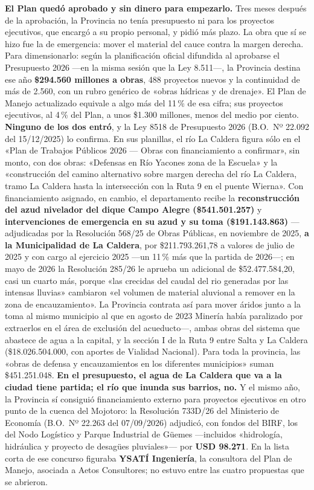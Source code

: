 \begin{cautela}
\textbf{El Plan quedó aprobado y sin dinero para empezarlo.} Tres meses después de la aprobación, la Provincia no tenía presupuesto ni para los proyectos ejecutivos, que encargó a su propio personal, y pidió más plazo. La obra que sí se hizo fue la de emergencia: mover el material del cauce contra la margen derecha. Para dimensionarlo: según la planificación oficial difundida al aprobarse el Presupuesto 2026 ---en la misma sesión que la Ley 8.511---, la Provincia destina ese año \textbf{\$294.560 millones a obras}, 488 proyectos nuevos y la continuidad de más de 2.560, con un rubro genérico de «obras hídricas y de drenaje». El Plan de Manejo actualizado equivale a algo más del 11\,\% de esa cifra; sus proyectos ejecutivos, al 4\,\% del Plan, a unos \$1.300 millones, menos del medio por ciento. \textbf{Ninguno de los dos entró}, y la Ley 8518 de Presupuesto 2026 (B.O.\ Nº 22.092 del 15/12/2025) lo confirma. En sus planillas, el río La Caldera figura sólo en el «Plan de Trabajos Públicos 2026 --- Obras con financiamiento a confirmar», sin monto, con dos obras: «Defensas en Río Yacones zona de la Escuela» y la «construcción del camino alternativo sobre margen derecha del río La Caldera, tramo La Caldera hasta la intersección con la Ruta 9 en el puente Wierna». Con financiamiento asignado, en cambio, el departamento recibe la \textbf{reconstrucción del azud nivelador del dique Campo Alegre (\$541.501.257)} y \textbf{intervenciones de emergencia en su azud y su toma (\$191.143.863)} ---adjudicadas por la Resolución 568/25 de Obras Públicas, en noviembre de 2025, \textbf{a la Municipalidad de La Caldera}, por \$211.793.261,78 a valores de julio de 2025 y con cargo al ejercicio 2025 ---un 11\,\% más que la partida de 2026---; en mayo de 2026 la Resolución 285/26 le aprueba un adicional de \$52.477.584,20, casi un cuarto más, porque «las crecidas del caudal del rio generadas por las intensas lluvias» cambiaron «el volumen de material aluvional a remover en la zona de encauzamiento». La Provincia contrata así para mover áridos junto a la toma al mismo municipio al que en agosto de 2023 Minería había paralizado por extraerlos en el área de exclusión del acueducto---, ambas obras del sistema que abastece de agua a la capital, y la sección I de la Ruta 9 entre Salta y La Caldera (\$18.026.504.000, con aportes de Vialidad Nacional). Para toda la provincia, las «obras de defensa y encauzamientos en los diferentes municipios» suman \$451.251.048. \textbf{En el presupuesto, el agua de La Caldera que va a la ciudad tiene partida; el río que inunda sus barrios, no.} Y el mismo año, la Provincia sí consiguió financiamiento externo para proyectos ejecutivos en otro punto de la cuenca del Mojotoro: la Resolución 733D/26 del Ministerio de Economía (B.O.\ Nº 22.263 del 07/09/2026) adjudicó, con fondos del BIRF, los del Nodo Logístico y Parque Industrial de Güemes ---incluidos «hidrología, hidráulica y proyecto de desagües pluviales»--- por \textbf{USD 98.271}. En la lista corta de ese concurso figuraba \textbf{YSATÍ Ingeniería}, la consultora del Plan de Manejo, asociada a Aetos Consultores; no estuvo entre las cuatro propuestas que se abrieron.


\end{cautela}
